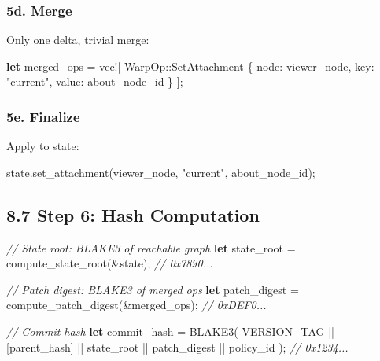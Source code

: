 \documentclass[
]{book}
\newenvironment{Shaded}{}{}
\newcommand{\CommentTok}[1]{\textcolor[rgb]{0.38,0.63,0.69}{\textit{#1}}}
\newcommand{\KeywordTok}[1]{\textcolor[rgb]{0.00,0.44,0.13}{\textbf{#1}}}
\newcommand{\NormalTok}[1]{#1}
\newcommand{\OperatorTok}[1]{\textcolor[rgb]{0.40,0.40,0.40}{#1}}
\newcommand{\PreprocessorTok}[1]{\textcolor[rgb]{0.74,0.48,0.00}{#1}}
\newcommand{\StringTok}[1]{\textcolor[rgb]{0.25,0.44,0.63}{#1}}
\begin{document}
\subsubsection{5d. Merge}\label{d.-merge}

Only one delta, trivial merge:

\begin{Shaded}
\begin{Highlighting}[]
\KeywordTok{let}\NormalTok{ merged\_ops }\OperatorTok{=} \PreprocessorTok{vec!}\NormalTok{[}
    \PreprocessorTok{WarpOp::}\NormalTok{SetAttachment }\OperatorTok{\{}\NormalTok{ node}\OperatorTok{:}\NormalTok{ viewer\_node}\OperatorTok{,}\NormalTok{ key}\OperatorTok{:} \StringTok{"current"}\OperatorTok{,}\NormalTok{ value}\OperatorTok{:}\NormalTok{ about\_node\_id }\OperatorTok{\}}
\NormalTok{]}\OperatorTok{;}
\end{Highlighting}
\end{Shaded}

\subsubsection{5e. Finalize}\label{e.-finalize}

Apply to state:

\begin{Shaded}
\begin{Highlighting}[]
\NormalTok{state}\OperatorTok{.}\NormalTok{set\_attachment(viewer\_node}\OperatorTok{,} \StringTok{"current"}\OperatorTok{,}\NormalTok{ about\_node\_id)}\OperatorTok{;}
\end{Highlighting}
\end{Shaded}

\subsection{8.7 Step 6: Hash Computation}\label{step-6-hash-computation}

\begin{Shaded}
\begin{Highlighting}[]
\CommentTok{// State root: BLAKE3 of reachable graph}
\KeywordTok{let}\NormalTok{ state\_root }\OperatorTok{=}\NormalTok{ compute\_state\_root(}\OperatorTok{\&}\NormalTok{state)}\OperatorTok{;}  \CommentTok{// 0x7890...}

\CommentTok{// Patch digest: BLAKE3 of merged ops}
\KeywordTok{let}\NormalTok{ patch\_digest }\OperatorTok{=}\NormalTok{ compute\_patch\_digest(}\OperatorTok{\&}\NormalTok{merged\_ops)}\OperatorTok{;}  \CommentTok{// 0xDEF0...}

\CommentTok{// Commit hash}
\KeywordTok{let}\NormalTok{ commit\_hash }\OperatorTok{=}\NormalTok{ BLAKE3(}
\NormalTok{    VERSION\_TAG }\OperatorTok{||}
\NormalTok{    [parent\_hash] }\OperatorTok{||}
\NormalTok{    state\_root }\OperatorTok{||}
\NormalTok{    patch\_digest }\OperatorTok{||}
\NormalTok{    policy\_id}
\NormalTok{)}\OperatorTok{;}  \CommentTok{// 0x1234...}
\end{Highlighting}
\end{Shaded}
\end{document}
